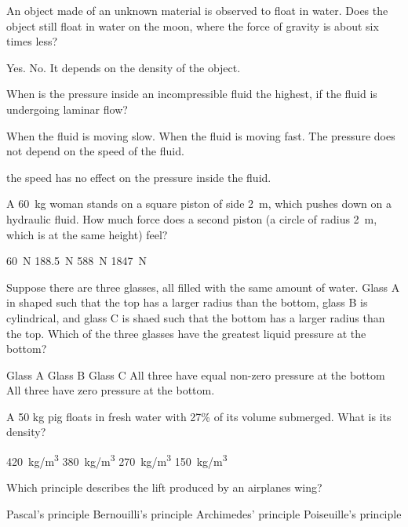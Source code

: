 \question An object made of an unknown material is observed to float in water. Does the object still float in water on the moon, where the force of gravity is about six times less?
\begin{checkboxes}
	\CorrectChoice Yes.
	\choice No.
	\choice It depends on the density of the object. 
\end{checkboxes}

\question When is the pressure inside an incompressible fluid the highest, if the fluid is undergoing laminar flow?
\begin{checkboxes}
	\CorrectChoice When the fluid is moving slow.
	\choice When the fluid is moving fast.
	\choice The pressure does not depend on the speed of the fluid.
\end{checkboxes} the speed has no effect on the pressure inside the fluid.

\question A \SI{60}{kg} woman stands on a square piston of side \SI{2}{m}, which pushes down on a hydraulic fluid.  How much force does a second piston (a circle of radius \SI{2}{m}, which is at the same height) feel?
\begin{checkboxes}
	\choice \SI{60}{N}
	\choice \SI{188.5}{N}
	\choice \SI{588}{N}
	\CorrectChoice \SI{1847}{N} \correct
\end{checkboxes}

\question Suppose there are three glasses, all filled with the same amount of water. Glass A in shaped such that the top has a larger radius than the bottom, glass B is cylindrical, and glass C is shaed such that the bottom has a larger radius than the top. Which of the three glasses have the greatest liquid pressure at the bottom?
\begin{checkboxes}
	\choice Glass A
	\choice Glass B
	\choice Glass C
	\CorrectChoice All three have equal non-zero pressure at the bottom \correct
	\choice All three have zero pressure at the bottom.  
\end{checkboxes}

\question A 50 kg pig floats in fresh water with 27\% of its volume submerged. What is its density?
\begin{checkboxes}
	\choice \SI{420}{kg/m^3}
	\choice \SI{380}{kg/m^3}
	\CorrectChoice \SI{270}{kg/m^3} \correct
	\choice \SI{150}{kg/m^3}
\end{checkboxes}

\question Which principle describes the lift produced by an airplanes wing?
\begin{checkboxes}
	\choice Pascal's principle
	\CorrectChoice Bernouilli's principle \correct
	\choice Archimedes' principle
	\choice Poiseuille's principle
\end{checkboxes}

